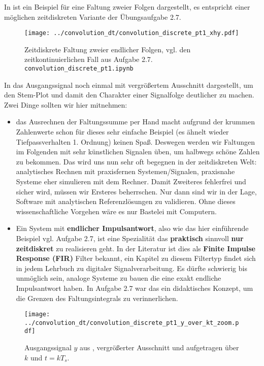 In  ist ein Beispiel für eine Faltung
zweier Folgen dargestellt, es entspricht einer möglichen zeitdiskreten
Variante der Übungsaufgabe 2.7.
%
\begin{figure}[t]
\centering
\texttt{[image: ../convolution\_dt/convolution\_discrete\_pt1\_xhy.pdf]}
\caption{Zeitdiskrete Faltung zweier endlicher Folgen, vgl. den zeitkontinuierlichen
Fall aus Aufgabe 2.7. \texttt{convolution\_discrete\_pt1.ipynb}}
\label{fig:convolution_discrete_pt1_xhy}
\end{figure}
%
In  das Ausgangssignal noch
einmal mit vergrößertem Ausschnitt dargestellt, um den Stem-Plot und damit den
Charakter einer Signalfolge deutlicher zu machen.
%
Zwei Dinge sollten wir hier mitnehmen:
\begin{itemize}
\item das Ausrechnen der Faltungssumme per Hand macht aufgrund der krummen Zahlenwerte
schon für dieses sehr einfache Beispiel (es ähnelt wieder Tiefpassverhalten 1. Ordnung)
keinen Spaß.
Deswegen werden wir Faltungen im Folgenden mit sehr künstlichen Signalen
üben, um halbwegs schöne Zahlen zu bekommen. Das wird uns nun
sehr oft begegnen in der zeitdiskreten Welt:
analytisches Rechnen mit praxisfernen Systemen/Signalen,
praxisnahe Systeme eher simulieren mit dem Rechner. Damit Zweiteres fehlerfrei und
sicher wird, müssen wir Ersteres beherrschen. Nur dann sind wir in der
Lage, Software mit analytischen Referenzlösungen zu validieren.
Ohne dieses wissenschaftliche Vorgehen wäre es nur Bastelei mit Computern.
\item Ein System mit \textbf{endlicher Impulsantwort}, also wie das hier einführende Beispiel
vgl. Aufgabe 2.7, ist eine Spezialität das
\textbf{praktisch} sinnvoll \textbf{nur zeitdiskret} zu realisieren geht. In der Literatur
ist dies als \textbf{Finite Impulse Response (FIR)} Filter bekannt, ein Kapitel
zu diesem Filtertyp findet sich in jedem Lehrbuch zu digitaler Signalverarbeitung.
Es dürfte schwierig bis unmöglich sein, analoge Systeme zu bauen die eine
exakt endliche Impulsantwort haben. In Aufgabe 2.7 war das ein didaktisches
Konzept, um die Grenzen des Faltungsintegrals zu verinnerlichen.
\end{itemize}
%
\begin{figure}[t]
\centering
\texttt{[image: ../convolution\_dt/convolution\_discrete\_pt1\_y\_over\_kt\_zoom.pdf]}
\caption{Ausgangssignal $y$ aus ,
vergrößerter Ausschnitt und aufgetragen über $k$ und $t=k T_s$.}
\label{fig:convolution_discrete_pt1_y_over_kt_zoom}
\end{figure}

